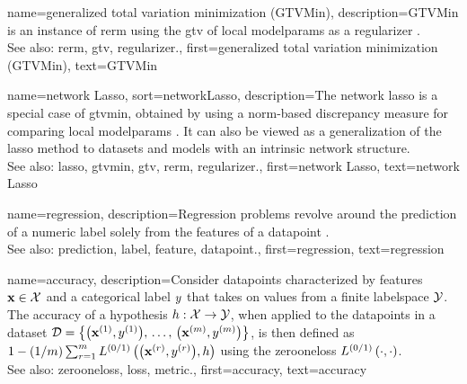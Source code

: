{name={generalized total variation minimization (GTVMin)},
	description={GTVMin is an instance of \gls{rerm} 
		using the \gls{gtv} of local \glspl{modelparam} as a \gls{regularizer} \cite{ClusteredFLTVMinTSP}.
					\\ 
		See also: \gls{rerm}, \gls{gtv}, \gls{regularizer}.},
	first={generalized total variation minimization (GTVMin)},
	text={GTVMin} 
}

{name={network Lasso},
sort={networkLasso},
	description={The network \gls{lasso} is a special case of 
		\gls{gtvmin}, obtained by using a \gls{norm}-based \gls{discrepancy} 
		\gls{measure} for comparing local \glspl{modelparam} \cite{NetworkLasso}. 
		It can also be viewed as a \gls{generalization} of the \gls{lasso} 
		method to \glspl{dataset} and \glspl{model} with an intrinsic network 
		structure.
			\\
		See also: \gls{lasso}, \gls{gtvmin}, \gls{gtv}, \gls{rerm}, \gls{regularizer}.},
	first={network Lasso},
	text={network Lasso}
}

{name={regression},
	description={Regression problems revolve around the 
		\gls{prediction} of a numeric \gls{label} solely from the \glspl{feature} of a \gls{datapoint} \cite[Ch. 2]{MLBasics}.
					\\ 
		See also: \gls{prediction}, \gls{label}, \gls{feature}, \gls{datapoint}.},
	first={regression},
	text={regression} 
}

{name={accuracy},
	description={Consider \glspl{datapoint} characterized by \glspl{feature} ${\bf x} \in \mathcal{X}$ and 
		a categorical \gls{label} $y$ that takes on values from a finite \gls{labelspace} $\mathcal{Y}$. The 
		accuracy of a \gls{hypothesis} $h: \mathcal{X} \rightarrow \mathcal{Y}$, when applied to the \glspl{datapoint} in a \gls{dataset} 
		$\mathcal{D} = \big\{ \big({\bf x}^{(1)}, y^{(1)} \big), \,\ldots, \,\big({\bf x}^{(m)},y^{(m)}\big) \big\}$, 
		is then defined as $1 - (1/m)\sum_{r=1}^{m} L^{(0/1)}\left(\big({\bf x}^{(r)},y^{(r)}\big),h \right)$ 
		using the \gls{zerooneloss} $L^{(0/1)}\left(\cdot,\cdot \right)$.
					\\ 
		See also: \gls{zerooneloss}, \gls{loss}, \gls{metric}.},
	first={accuracy},
	text={accuracy} 
}

